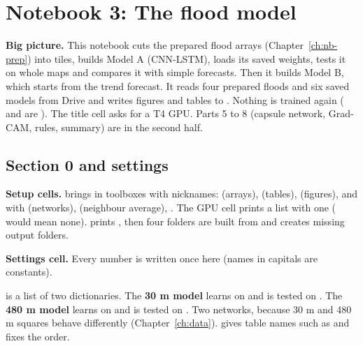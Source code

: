 \sloppy
\section{Notebook 3: The flood model}\label{ch:nb-model}

\textbf{Big picture.} This notebook cuts the prepared flood arrays (Chapter~\ref{ch:nb-prep}) into tiles, builds Model A (CNN-LSTM), loads its saved weights, tests it on whole maps and compares it with simple forecasts. Then it builds Model B, which starts from the trend forecast.
It reads four prepared floods and six saved models from Drive and writes figures and tables to . Nothing is trained again ( and  are ). The title cell asks for a T4 GPU. Parts 5 to 8 (capsule network, Grad-CAM, rules, summary) are in the second half.

\subsection{Section 0 and settings}

\textbf{Setup cells.}  brings in toolboxes with nicknames:  (arrays),  (tables),  (figures),  and  with  (networks),  (neighbour average), . The GPU cell prints a list with one  (\cd{[]} would mean none).  prints , then four folders are built from  and  creates missing output folders.

\textbf{Settings cell.} Every number is written once here (names in capitals are constants).


 is a list of two dictionaries. The \textbf{30 m model} learns on  and is tested on . The \textbf{480 m model} learns on  and is tested on . Two networks, because 30 m and 480 m squares behave differently (Chapter~\ref{ch:data}).  gives table names such as  and fixes the order.


